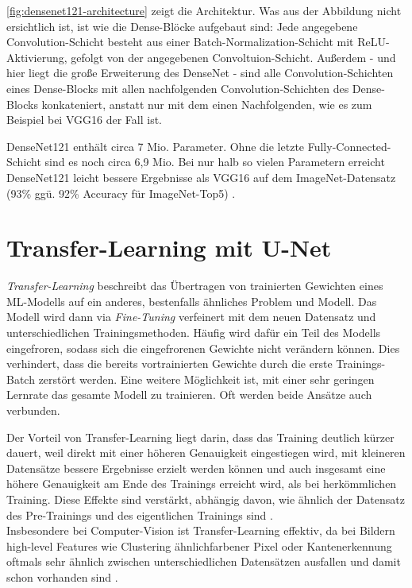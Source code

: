 \autoref{fig:densenet121-architecture} zeigt die Architektur. Was aus der Abbildung nicht ersichtlich ist, ist wie die 
Dense-Blöcke aufgebaut sind: Jede angegebene Convolution-Schicht besteht aus einer Batch-Normalization-Schicht mit \ac{ReLU}-Aktivierung,
gefolgt von der angegebenen Convoltuion-Schicht. Außerdem - und hier liegt die große Erweiterung des DenseNet - sind alle 
Convolution-Schichten eines Dense-Blocks mit allen nachfolgenden Convolution-Schichten des Dense-Blocks konkateniert,
anstatt nur mit dem einen Nachfolgenden, wie es zum Beispiel bei VGG16 der Fall ist. 

DenseNet121 enthält circa 7 Mio. Parameter. Ohne die letzte Fully-Connected-Schicht sind es noch circa 6,9 Mio. 
Bei nur halb so vielen Parametern erreicht DenseNet121 leicht bessere Ergebnisse als VGG16 auf dem ImageNet-Datensatz 
(93\% ggü. 92\% Accuracy für ImageNet-Top5) \cite{Huang.25082016}. 


\section{Transfer-Learning mit U-Net} \label{sec:transfer-learning}

\textit{Transfer-Learning} beschreibt das Übertragen von trainierten Gewichten eines \ac{ML}-Modells auf ein anderes, 
bestenfalls ähnliches Problem und Modell. Das Modell wird dann via \textit{Fine-Tuning} verfeinert mit dem neuen Datensatz und unterschiedlichen Trainingsmethoden.
Häufig wird dafür ein Teil des Modells eingefroren, sodass sich die eingefrorenen Gewichte nicht verändern können. Dies verhindert, 
dass die bereits vortrainierten Gewichte durch die erste Trainings-Batch zerstört werden. Eine weitere Möglichkeit ist,
mit einer sehr geringen Lernrate das gesamte Modell zu trainieren. Oft werden beide Ansätze auch verbunden.

Der Vorteil von Transfer-Learning liegt darin, dass das Training deutlich kürzer dauert, 
weil direkt mit einer höheren Genauigkeit eingestiegen wird, mit kleineren Datensätze bessere Ergebnisse erzielt werden können
 und auch insgesamt eine höhere Genauigkeit 
am Ende des Trainings erreicht wird, als bei herkömmlichen Training. Diese Effekte sind verstärkt, 
abhängig davon, wie ähnlich der Datensatz des Pre-Trainings und des eigentlichen Trainings sind \cite{Ruder.3212017}. \\
Insbesondere bei Computer-Vision ist Transfer-Learning effektiv, da bei Bildern high-level Features wie Clustering 
ähnlichfarbener Pixel oder Kantenerkennung oftmals sehr ähnlich zwischen unterschiedlichen Datensätzen ausfallen 
und damit schon vorhanden sind \cite{Ruder.3212017}. 

